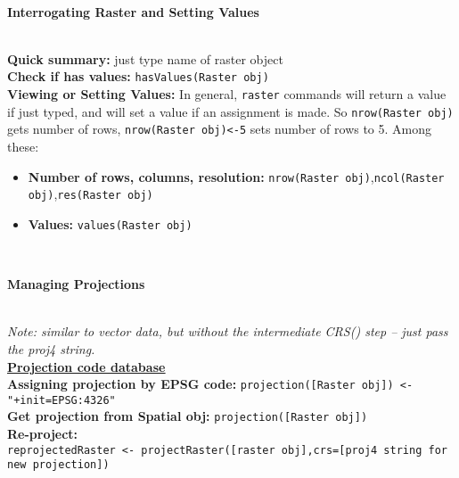 \documentclass[10pt]{article}
\begin{document}

\hrulefill \\ 
\centerline{\textbf{Interrogating Raster and Setting Values}} \\
\textbf{Quick summary:} just type name of raster object \\
\textbf{Check if has values:} \texttt{hasValues(Raster obj)}\\

\textbf{Viewing or Setting Values:} In general, \texttt{raster} commands will return a value if just typed, and will set a value if an assignment is made. So \texttt{nrow(Raster obj)} gets number of rows, \texttt{nrow(Raster obj)<-5} sets number of rows to 5. Among these:
\begin{itemize}
	\item \textbf{Number of rows, columns, resolution:} \texttt{nrow(Raster obj)},\texttt{ncol(Raster obj)},\texttt{res(Raster obj)}
	\item \textbf{Values:} \texttt{values(Raster obj)}\\
\end{itemize}


\hrulefill \\ 
\centerline{\textbf{Managing Projections}} \\
\emph{Note: similar to vector data, but without the intermediate CRS() step -- just pass the proj4 string.}\\
\href{http://www.spatialreference.org/}{\underline{\textbf{Projection code database}}} \\
\textbf{Assigning projection by EPSG code:} \texttt{projection([Raster obj]) <-"+init=EPSG:4326"}\\
\textbf{Get projection from Spatial obj:} \texttt{projection([Raster obj])} \\
\textbf{Re-project:} \\
\hspace*{0.3cm}\texttt{reprojectedRaster <- projectRaster([raster obj],crs=[proj4 string for new projection])}\\
\end{document}
